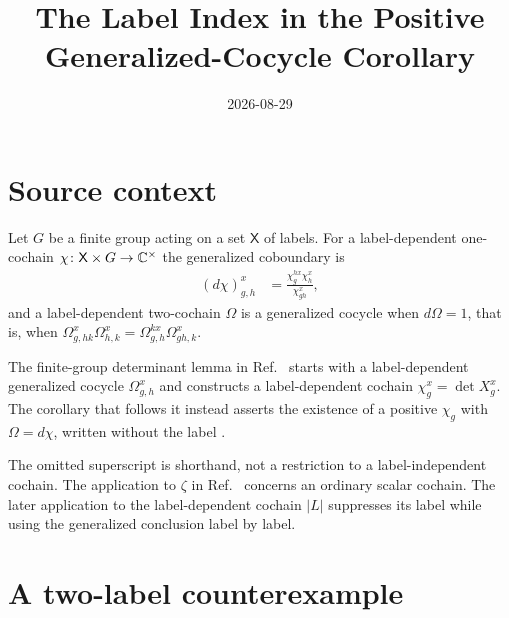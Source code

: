 \documentclass{article}
\title{The Label Index in the Positive Generalized-Cocycle Corollary}
\author{}
\date{2026-08-29}
\begin{document}
\maketitle
{}

\section{Source context}

Let $G$ be a finite group acting on a set $\mathsf X$ of labels. For a
label-dependent one-cochain $\chi\colon\mathsf X\times G\to\mathbb{C}^\times$ the
generalized coboundary is
\begin{align}
    (d\chi)^x_{g,h}
        &=\frac{\chi^{h x}_g\chi^x_h}{\chi^x_{gh}},
    \label{eq:fbc25_positive_block_index_coboundary}
\end{align}
and a label-dependent two-cochain $\Omega$ is a generalized cocycle when
$d\Omega=1$, that is, when
$\Omega^x_{g,hk}\Omega^x_{h,k}=\Omega^{k x}_{g,h}\Omega^x_{gh,k}$.

The finite-group determinant lemma in
Ref.~\cite[lines~5931--5947]{FrancoRubio2025MPUGauging} starts with a
label-dependent generalized cocycle $\Omega^x_{g,h}$ and constructs a
label-dependent cochain $\chi^x_g=\det X^x_g$. The corollary that follows it
instead asserts the existence of a positive $\chi_g$ with $\Omega=d\chi$,
written without the label
\cite[Corollary~\texttt{cor:positive\_trivial}, lines~5950--5952]
{FrancoRubio2025MPUGauging}.

The omitted superscript is shorthand, not a restriction to a label-independent
cochain. The application to $\zeta$ in
Ref.~\cite[line~6018]{FrancoRubio2025MPUGauging} concerns an ordinary scalar
cochain. The later application to the label-dependent cochain $|L|$
\cite[lines~6023--6029]{FrancoRubio2025MPUGauging} suppresses its label
while using the generalized conclusion label by label.

\section{A two-label counterexample}
\end{document}

